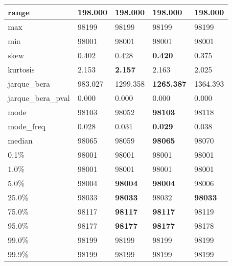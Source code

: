 \begin{table}[H]
\begin{tabular}{|l|m{10em}|m{10em}|m{10em}|m{10em}|}
\hline range & 198.000 & 198.000 & 198.000 & 198.000 \\
\hline max & 98199 & 98199 & 98199 & 98199 \\
\hline min & 98001 & 98001 & 98001 & 98001 \\
\hline skew & 0.402 & 0.428 & \bfseries 0.420 & \cellcolor[rgb]{0.9, 0.54, 0.52} 0.375 \\
\hline kurtosis & 2.153 & \bfseries 2.157 & 2.163 & \cellcolor[rgb]{0.9, 0.54, 0.52} 2.025 \\
\hline jarque\_bera & 983.027 & 1299.358 & \bfseries 1265.387 & \cellcolor[rgb]{0.9, 0.54, 0.52} 1364.393 \\
\hline jarque\_bera\_pval & 0.000 & 0.000 & 0.000 & 0.000 \\
\hline mode & 98103 & \cellcolor[rgb]{0.9, 0.54, 0.52} 98052 & \bfseries 98103 & 98118 \\
\hline mode\_freq & 0.028 & 0.031 & \bfseries 0.029 & \cellcolor[rgb]{0.9, 0.54, 0.52} 0.038 \\
\hline median & 98065 & \cellcolor[rgb]{0.9, 0.54, 0.52} 98059 & \bfseries 98065 & 98070 \\
\hline 0.1\% & 98001 & 98001 & 98001 & 98001 \\
\hline 1.0\% & 98001 & 98001 & 98001 & 98001 \\
\hline 5.0\% & 98004 & \bfseries 98004 & \bfseries 98004 & \cellcolor[rgb]{0.9, 0.54, 0.52} 98006 \\
\hline 25.0\% & 98033 & \bfseries 98033 & \cellcolor[rgb]{0.9, 0.54, 0.52} 98032 & \bfseries 98033 \\
\hline 75.0\% & 98117 & \bfseries 98117 & \bfseries 98117 & \cellcolor[rgb]{0.9, 0.54, 0.52} 98119 \\
\hline 95.0\% & 98177 & \bfseries 98177 & \bfseries 98177 & \cellcolor[rgb]{0.9, 0.54, 0.52} 98178 \\
\hline 99.0\% & 98199 & 98199 & 98199 & 98199 \\
\hline 99.9\% & 98199 & 98199 & 98199 & 98199 \\
\hline
\end{tabular}
\end{table}
